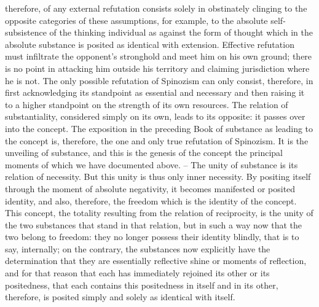 therefore, of any external refutation consists solely in obstinately clinging
to the opposite categories of these assumptions, for example, to the absolute
self-subsistence of the thinking individual as against the form of thought
which in the absolute substance is posited as identical with extension.
Effective refutation must infiltrate the opponent’s stronghold and meet
him on his own ground; there is no point in attacking him outside his
territory and claiming jurisdiction where he is not. The only possible
refutation of Spinozism can only consist, therefore, in first acknowledging
its standpoint as essential and necessary and then raising it to a higher
standpoint on the strength of its own resources. The relation of substantiality,
considered simply on its own, leads to its opposite: it passes over into the
concept. The exposition in the preceding Book of substance as leading to
the concept is, therefore, the one and only true refutation of Spinozism. It is
the unveiling of substance, and this is the genesis of the concept the principal
moments of which we have documented above. – The unity of substance is
its relation of necessity. But this unity is thus only inner necessity. By positing
itself through the moment of absolute negativity, it becomes manifested
or posited identity, and also, therefore, the freedom which is the identity
of the concept. This concept, the totality resulting from the relation of
reciprocity, is the unity of the two substances that stand in that relation,
but in such a way now that the two belong to freedom: they no longer
possess their identity blindly, that is to say, internally; on the contrary, the
substances now explicitly have the determination that they are essentially
reflective shine or moments of reflection, and for that reason that each has
immediately rejoined its other or its positedness, that each contains this
positedness in itself and in its other, therefore, is posited simply and solely
as identical with itself.

